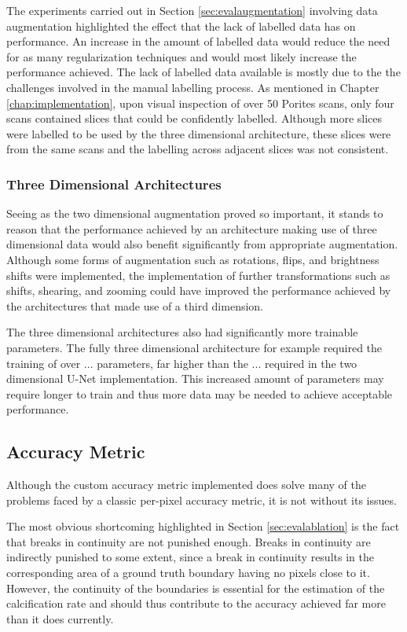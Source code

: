The experiments carried out in Section \ref{sec:evalaugmentation} involving data augmentation highlighted the effect that the lack of labelled data has on performance. An increase in the amount of labelled data would reduce the need for as many regularization techniques and would most likely increase the performance achieved. The lack of labelled data available is mostly due to the the challenges involved in the manual labelling process. As mentioned in Chapter \ref{chap:implementation}, upon visual inspection of over 50 Porites scans, only four scans contained slices that could be confidently labelled. Although more slices were labelled to be used by the three dimensional architecture, these slices were from the same scans and the labelling across adjacent slices was not consistent.

\subsubsection{Three Dimensional Architectures}

Seeing as the two dimensional augmentation proved so important, it stands to reason that the performance achieved by an architecture making use of three dimensional data would also benefit significantly from appropriate augmentation. Although some forms of augmentation such as rotations, flips, and brightness shifts were implemented, the implementation of further transformations such as shifts, shearing, and zooming could have improved the performance achieved by the architectures that made use of a third dimension.

The three dimensional architectures also had significantly more trainable parameters. The fully three dimensional architecture for example required the training of over ... parameters, far higher than the ... required in the two dimensional U-Net implementation. This increased amount of parameters may require longer to train and thus more data may be needed to achieve acceptable performance.

\subsection{Accuracy Metric}
\label{sec:evalaccuracy}

Although the custom accuracy metric implemented does solve many of the problems faced by a classic per-pixel accuracy metric, it is not without its issues.

The most obvious shortcoming highlighted in Section \ref{sec:evalablation} is the fact that breaks in continuity are not punished enough. Breaks in continuity are indirectly punished to some extent, since a break in continuity results in the corresponding area of a ground truth boundary having no pixels close to it. However, the continuity of the boundaries is essential for the estimation of the calcification rate and should thus contribute to the accuracy achieved far more than it does currently.

